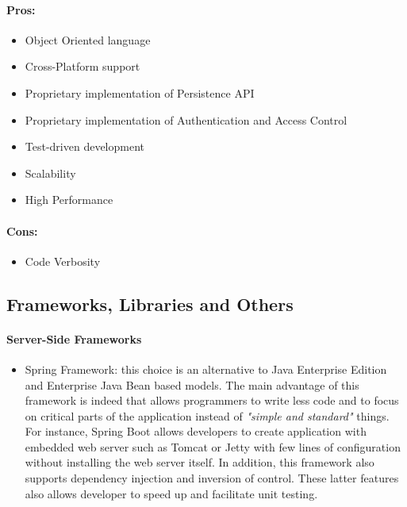 \documentclass[a4paper]{article}
\begin{document}
\paragraph{Pros:}

\begin{itemize}
    \item Object Oriented language
    \item Cross-Platform support
    \item Proprietary implementation of Persistence API
    \item Proprietary implementation of Authentication and Access Control
    \item Test-driven development
    \item Scalability
    \item High Performance
\end{itemize}

\paragraph{Cons:}
\begin{itemize}
    \item Code Verbosity
\end{itemize}

\subsection{Frameworks, Libraries and Others}

\paragraph{Server-Side Frameworks}
\begin{itemize}
    \item Spring Framework: this choice is an alternative to Java Enterprise Edition and Enterprise Java Bean based models. The main advantage of this framework is indeed that allows programmers to write less code and to focus on critical parts of the application instead of \textit{"simple and standard"} things. For instance, Spring Boot allows developers to create application with embedded web server such as Tomcat or Jetty with few lines of configuration without installing the web server itself. In addition, this framework also supports dependency injection and inversion of control. These latter features also allows developer to speed up and facilitate unit testing.
\end{itemize}
\end{document}
